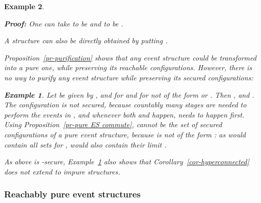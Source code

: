 \documentclass[twocolumn]{article}
\newcommand{\out}[1]{}        \newcommand{\ams}[1]{#1}      \usepackage[preserveurlmacro]{breakurl}
\newtheorem{exam}{Example}
\newenvironment{example}[1]{\begin{exam} \rm \label{ex-#1} }{\end{exam}}
\newenvironment{proof}{\begin{trivlist} \item[\hspace{\labelsep}\bf
Proof:]}{\hfill \end{trivlist}}
\newcommand{\pr}[1]{Proposition~\ref{pr-#1}}
\newcommand{\cor}[1]{Corollary~\ref{cor-#1}}
\newcommand{\ex}[1]{Example~\ref{ex-#1}}
\newcommand{\phrase}[1]{\index{#1}{\em #1}}		\newcommand{\implies}{\Rightarrow}
\begin{document}
\begin{example}{causality}
\begin{proof}
One can take  to be 
and   to be .
\end{proof}
A structure  can also be directly
obtained by putting .

\pr{purification} shows that any event structure could be
transformed into a pure one, while preserving its reachable
configurations.  However, there is no way to purify any event
structure while preserving its secured configurations:

\begin{example}{unpurifiable}
Let  be given by ,
 and  for 
and \mbox{} for  not of the form  or .
Then\linebreak
,
 and .
The configuration  is not secured, because countably many
stages are needed to perform the events in , and whenever both
 and  happen,  needs to happen first.
Using \pr{pure ES commute},  cannot be the set of secured
configurations of a pure event structure, because  is not of
the form : as  would contain all sets
 for ,  would also
contain their limit .
\end{example}
As  above is -secure, \ex{unpurifiable} also shows that
\cor{hyperconnected} does not extend to impure structures.

\subsubsection*{Reachably pure event structures}\label{reachably pure}

\out{
 As we will see in Section~\ref{brands}, those event structures
 appearing in the literature for which a notion of configuration
 has been studied that corresponds to our concept of a left-closed
 configuration translate to event structures in our sense that are pure.
 The notion of a secured configuration on the other hand has been
 applied to impure event structures as well. The event structures of
 \ex{impure} for instance can easily be cast as event structures in the
 sense of {\sc Winskel} \cite{Wi87a,Wi89}. However, the event structures
 studied before correspond to even structures in our sense that are
 \phrase{singular}, meaning that whenever , either 
 or  is a singleton. For such event structures impureness is
 harmless, because, as is straightforward to check, the impure bits of
 the enabling relation can be deleted without changing the set of
 secured configurations or the transition relation between them in any way.
}


\end{example}
\end{document}
